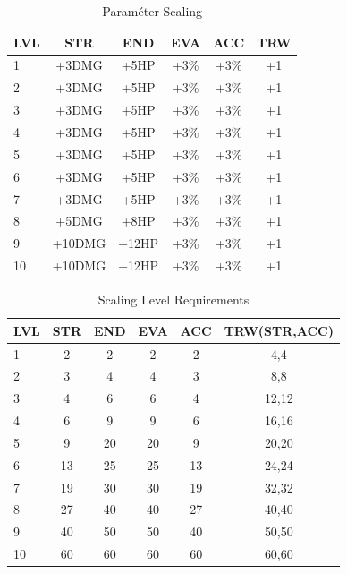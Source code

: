 
\begin{table}[!ht]
    \centering
    \caption{Paraméter Scaling}
    \label{table:scalingtable}
    \begin{tabular}{|l|c|c|c|c|c|}
    \hline
    LVL & STR  & END & EVA & ACC & TRW \\
    \hline
    1 & +3DMG & +5HP & +3\% & +3\% & +1 \\
    \hline
    2 & +3DMG & +5HP & +3\% & +3\% & +1 \\
    \hline
    3 & +3DMG & +5HP & +3\% & +3\% & +1 \\
    \hline
    4 & +3DMG & +5HP & +3\% & +3\% & +1 \\
    \hline
    5 & +3DMG & +5HP & +3\% & +3\% & +1 \\
    \hline
    6 & +3DMG & +5HP & +3\% & +3\% & +1 \\
    \hline
    7 & +3DMG & +5HP & +3\% & +3\% & +1 \\
    \hline
    8 & +5DMG & +8HP & +3\% & +3\% & +1 \\
    \hline
    9 & +10DMG & +12HP & +3\% & +3\% & +1 \\
    \hline
    10 & +10DMG & +12HP & +3\% & +3\% & +1 \\
    \hline
    \end{tabular}
\end{table}

\begin{table}[!ht]
    \centering
    \caption{Scaling Level Requirements}
    \label{table:scalingleveltable}
    \begin{tabular}{|l|c|c|c|c|c|}
        \hline
        LVL & STR  & END & EVA & ACC & TRW(STR,ACC) \\
        \hline
        1 & 2 & 2 & 2 & 2 & 4,4 \\
        \hline
        2 & 3 & 4 & 4 & 3 & 8,8 \\
        \hline
        3 & 4 & 6 & 6 & 4 & 12,12 \\
        \hline
        4 & 6 & 9 & 9 & 6 & 16,16 \\
        \hline
        5 & 9 & 20 & 20 & 9 & 20,20 \\
        \hline
        6 & 13 & 25 & 25 & 13 & 24,24 \\
        \hline
        7 & 19 & 30 & 30 & 19 & 32,32 \\
        \hline
        8 & 27 & 40 & 40 & 27 & 40,40 \\
        \hline
        9 & 40 & 50 & 50 & 40 & 50,50 \\
        \hline
        10 & 60 & 60 & 60 & 60 & 60,60 \\
        \hline
    \end{tabular}
\end{table}

